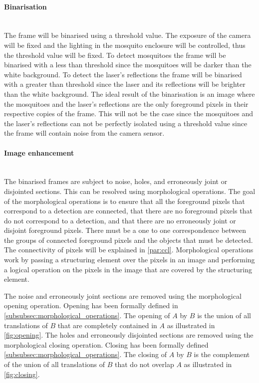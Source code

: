 \paragraph{Binarisation}\mbox{}\\
The frame will be binarised using a threshold value. The exposure of the camera will be fixed and the lighting in the mosquito enclosure will be controlled, thus the threshold value will be fixed. To detect mosquitoes the frame will be binarised with a less than threshold since the mosquitoes will be darker than the white background. To detect the laser's reflections the frame will be binarised with a greater than threshold since the laser and its reflections will be brighter than the white background. The ideal result of the binarisation is an image where the mosquitoes and the laser's reflections are the only foreground pixels in their respective copies of the frame. This will not be the case since the mosquitoes and the laser's reflections can not be perfectly isolated using a threshold value since the frame will contain noise from the camera sensor.


\paragraph{Image enhancement}\mbox{}\\
The binarised frames are subject to noise, holes, and erroneously joint or disjointed sections. This can be resolved using morphological operations.
The goal of the morphological operations is to ensure that all the foreground pixels that correspond to a detection are connected, that there are no foreground pixels that do not correspond to a detection, and that there are no erroneously joint or disjoint foreground pixels. There must be a one to one correspondence between the groups of connected foreground pixels and the objects that must be detected. The connectivity of pixels will be explained in \autoref{par:ccl}. Morphological operations work by passing a structuring element over the pixels in an image and performing a logical operation on the pixels in the image that are covered by the structuring element.

The noise and erroneously joint sections are removed using the morphological opening operation. Opening has been formally defined in \autoref{subsubsec:morphological_operations}. The opening of $A$ by $B$ is the union of all translations of $B$ that are completely contained in $A$ as illustrated in \autoref{fig:opening}. The holes and erroneously disjointed sections are removed using the morphological closing operation. Closing has been formally defined \autoref{subsubsec:morphological_operations}. The closing of $A$ by $B$ is the complement of the union of all translations of $B$ that do not overlap $A$ as illustrated in \autoref{fig:closing}.

